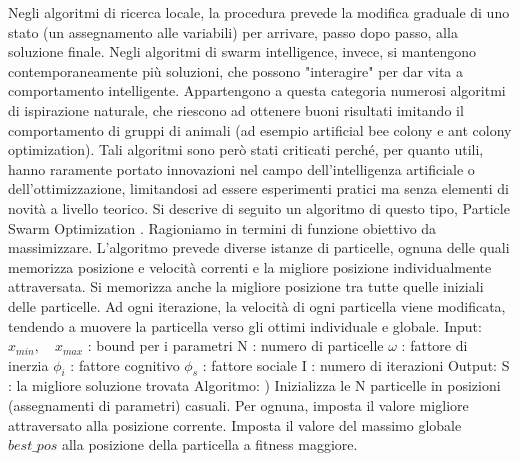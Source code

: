 \documentclass[12pt]{article}
\begin{document}
Negli algoritmi di ricerca locale, la procedura prevede la modifica graduale di uno stato (un assegnamento alle variabili) per arrivare, passo dopo passo, alla soluzione finale. Negli algoritmi di swarm intelligence, invece, si mantengono contemporaneamente più soluzioni, che possono "interagire" per dar vita a comportamento intelligente. Appartengono a questa categoria numerosi algoritmi di ispirazione naturale, che riescono ad ottenere buoni risultati imitando il comportamento di gruppi di animali (ad esempio artificial bee colony e ant colony optimization). Tali algoritmi sono però stati criticati perché, per quanto utili, hanno raramente portato innovazioni nel campo dell'intelligenza artificiale o dell'ottimizzazione, limitandosi ad essere esperimenti pratici ma senza elementi di novità a livello teorico. \cite{Sorensen2015}\newline
\newline
Si descrive di seguito un algoritmo di questo tipo, Particle Swarm Optimization \cite{KennedyEberhart1995}. Ragioniamo in termini di funzione obiettivo da massimizzare. L'algoritmo prevede diverse istanze di particelle, ognuna delle quali memorizza posizione e velocità correnti e la migliore posizione individualmente attraversata. Si memorizza anche la migliore posizione tra tutte quelle iniziali delle particelle. Ad ogni iterazione, la velocità di ogni particella viene modificata, tendendo a muovere la particella verso gli ottimi individuale e globale.\newline
\newline
Input:\newline
\tab \tab $x_{min}, \quad x_{max}$ : bound per i parametri
\tab \tab N : numero di particelle \newline
\tab \tab $\omega$ : fattore di inerzia \newline
\tab \tab $\phi_i$ : fattore cognitivo \newline
\tab \tab $\phi_s$ : fattore sociale \newline
\tab \tab I : numero di iterazioni \newline
\newline
Output: \newline
\tab \tab S : la migliore soluzione trovata \newline
\newline
Algoritmo: \newline
\tab {}) Inizializza le N particelle in posizioni (assegnamenti di parametri) casuali. Per ognuna, imposta il valore migliore attraversato alla posizione corrente. Imposta il valore del massimo globale $best\_pos$ alla posizione della particella a fitness maggiore. \newline
\end{document}
